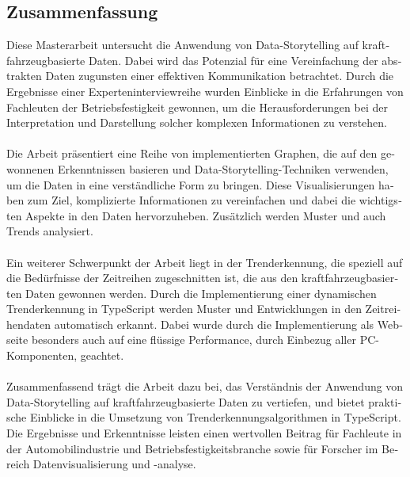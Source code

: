 \begin{otherlanguage}{ngerman}
	\chapter*{Zusammenfassung}
Diese Masterarbeit untersucht die Anwendung von Data-Storytelling auf kraftfahrzeugbasierte Daten. Dabei wird das Potenzial für eine Vereinfachung der abstrakten Daten zugunsten einer effektiven Kommunikation betrachtet. Durch die Ergebnisse einer Experteninterviewreihe wurden Einblicke in die Erfahrungen von Fachleuten der Betriebsfestigkeit gewonnen, um die Herausforderungen bei der Interpretation und Darstellung solcher komplexen Informationen zu verstehen.\\\\
Die Arbeit präsentiert eine Reihe von implementierten Graphen, die auf den gewonnenen Erkenntnissen basieren und Data-Storytelling-Techniken verwenden, um die Daten in eine verständliche Form zu bringen. Diese Visualisierungen haben zum Ziel, komplizierte Informationen zu vereinfachen und dabei die wichtigsten Aspekte in den Daten hervorzuheben. Zusätzlich werden Muster und auch Trends analysiert.\\\\
Ein weiterer Schwerpunkt der Arbeit liegt in der Trenderkennung, die speziell auf die Bedürfnisse der Zeitreihen zugeschnitten ist, die aus den kraftfahrzeugbasierten Daten gewonnen werden. Durch die Implementierung einer dynamischen Trenderkennung in TypeScript werden Muster und Entwicklungen in den Zeitreihendaten automatisch erkannt. Dabei wurde durch die Implementierung als Webseite besonders auch auf eine flüssige Performance, durch Einbezug aller PC-Komponenten, geachtet. \\\\
Zusammenfassend trägt die Arbeit dazu bei, das Verständnis der Anwendung von Data-Storytelling auf kraftfahrzeugbasierte Daten zu vertiefen, und bietet praktische Einblicke in die Umsetzung von Trenderkennungsalgorithmen in TypeScript. Die Ergebnisse und Erkenntnisse leisten einen wertvollen Beitrag für Fachleute in der Automobilindustrie und Betriebsfestigkeitsbranche sowie für Forscher im Bereich Datenvisualisierung und -analyse.
\end{otherlanguage}

